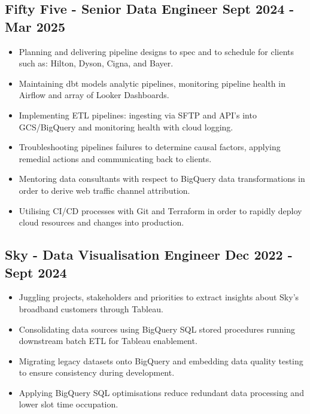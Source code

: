 \documentclass[a4paper, 9pt]{article}
\begin{document}
\subsection*{\textbf{Fifty Five - Senior Data Engineer} \hfill  Sept 2024 - Mar 2025}
\begin{itemize}[noitemsep]
    \item Planning and delivering pipeline designs to spec and to schedule for clients such as: Hilton, Dyson, Cigna, and Bayer.
    \item Maintaining dbt models analytic pipelines, monitoring pipeline health in Airflow and array of Looker Dashboards.
    \item Implementing ETL pipelines: ingesting via SFTP and API's into GCS/BigQuery and monitoring health with cloud logging.
    \item Troubleshooting pipelines failures to determine causal factors, applying remedial actions and communicating back to clients.
    \item Mentoring data consultants with respect to BigQuery data transformations in order to derive web traffic channel attribution.
    \item Utilising CI/CD processes with Git and Terraform in order to rapidly deploy cloud resources and changes into production.
\end{itemize}

\subsection*{\textbf{Sky - Data Visualisation Engineer} \hfill  Dec 2022 - Sept 2024}
\begin{itemize}[noitemsep]
    \item Juggling projects, stakeholders and priorities to extract insights about Sky's broadband customers through Tableau.
    \item Consolidating data sources using BigQuery SQL stored procedures running downstream batch ETL for Tableau enablement.
    \item Migrating legacy datasets onto BigQuery and embedding data quality testing to ensure consistency during development.
    \item Applying BigQuery SQL optimisations reduce redundant data processing and lower slot time occupation.
\end{itemize}
\end{document}
